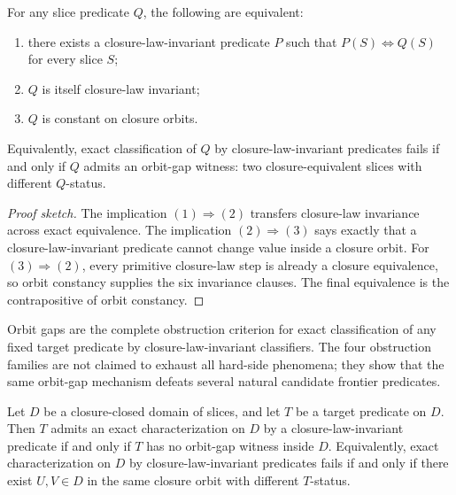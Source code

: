 \begin{proposition}\label{prop:orbit-gap-completeness}
For any slice predicate $Q$, the following are equivalent:
\begin{enumerate}
\item there exists a closure-law-invariant predicate $P$ such that $P(S) \iff Q(S)$ for every slice $S$;
\item $Q$ is itself closure-law invariant;
\item $Q$ is constant on closure orbits.
\end{enumerate}
Equivalently, exact classification of $Q$ by closure-law-invariant predicates fails if and only if $Q$ admits an orbit-gap witness: two closure-equivalent slices with different $Q$-status.
\end{proposition}

\begin{proof}[Proof sketch]
The implication $(1)\Rightarrow(2)$ transfers closure-law invariance across exact equivalence. The implication $(2)\Rightarrow(3)$ says exactly that a closure-law-invariant predicate cannot change value inside a closure orbit. For $(3)\Rightarrow(2)$, every primitive closure-law step is already a closure equivalence, so orbit constancy supplies the six invariance clauses. The final equivalence is the contrapositive of orbit constancy.
\end{proof}

Orbit gaps are the complete obstruction criterion for exact classification of any fixed target predicate by closure-law-invariant classifiers. The four obstruction families are not claimed to exhaust all hard-side phenomena; they show that the same orbit-gap mechanism defeats several natural candidate frontier predicates.

\begin{corollary}\label{cor:orbit-gap-completeness-domain}
Let $D$ be a closure-closed domain of slices, and let $T$ be a target predicate on $D$. Then $T$ admits an exact characterization on $D$ by a closure-law-invariant predicate if and only if $T$ has no orbit-gap witness inside $D$. Equivalently, exact characterization on $D$ by closure-law-invariant predicates fails if and only if there exist $U,V \in D$ in the same closure orbit with different $T$-status.
\end{corollary}

